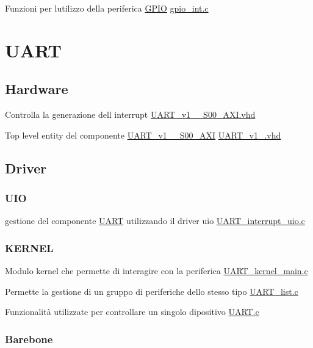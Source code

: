 \begin{DoxyItemize}
\item Funzioni per l\textquotesingle{}utilizzo della periferica \hyperlink{structGPIO}{G\+P\+IO}  \hyperlink{gpio__int_8c}{gpio\+\_\+int.\+c}
\end{DoxyItemize}\hypertarget{index_UART}{}\section{U\+A\+RT}\label{index_UART}
\hypertarget{index_Hardware}{}\subsection{Hardware}\label{index_Hardware}

\begin{DoxyItemize}
\item Controlla la generazione dell\textquotesingle{} interrupt \hyperlink{UART__v1__0__S00__AXI_8vhd}{U\+A\+R\+T\+\_\+v1\+\_\+\_\+\+S00\+\_\+\+A\+X\+I.\+vhd}
\item Top level entity del componente \hyperlink{classUART__v1__0__S00__AXI}{U\+A\+R\+T\+\_\+v1\+\_\+\_\+\+S00\+\_\+\+A\+XI} \hyperlink{UART__v1__0_8vhd}{U\+A\+R\+T\+\_\+v1\+\_.\+vhd} 
\end{DoxyItemize}\hypertarget{index_Driver}{}\subsection{Driver}\label{index_Driver}
\hypertarget{index_UIO}{}\subsubsection{U\+IO}\label{index_UIO}

\begin{DoxyItemize}
\item gestione del componente \hyperlink{structUART}{U\+A\+RT} utilizzando il driver uio \hyperlink{UART__interrupt__uio_8c}{U\+A\+R\+T\+\_\+interrupt\+\_\+uio.\+c} 
\end{DoxyItemize}\hypertarget{index_KERNEL}{}\subsubsection{K\+E\+R\+N\+EL}\label{index_KERNEL}

\begin{DoxyItemize}
\item Modulo kernel che permette di interagire con la periferica \hyperlink{UART__kernel__main_8c}{U\+A\+R\+T\+\_\+kernel\+\_\+main.\+c}
\item Permette la gestione di un gruppo di periferiche dello stesso tipo \hyperlink{UART__list_8c}{U\+A\+R\+T\+\_\+list.\+c}
\item Funzionalità utilizzate per controllare un singolo dipositivo \hyperlink{UART_8c}{U\+A\+R\+T.\+c} 
\end{DoxyItemize}\hypertarget{index_Barebone}{}\subsubsection{Barebone}\label{index_Barebone}

